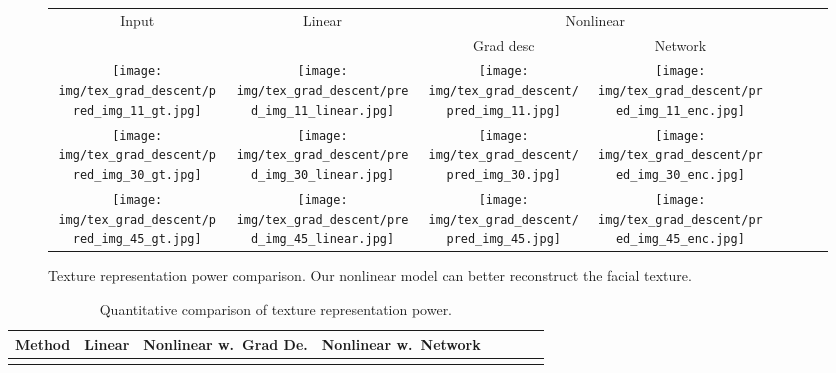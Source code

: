 \begin{figure}[t!]
\begin{center}
\small
\setlength{\tabcolsep}{3pt}
\begin{tabular}{ @{}c@{}c@{}c@{}c@{}c@{}c@{}c@{\hskip 1.5mm}c@{}}
\multirow{2}{*}{Input} & \multirow{2}{*}{Linear} & \multicolumn{2}{c}{Nonlinear} \\ & & Grad desc & Network \\
\texttt{[image: img/tex\_grad\_descent/pred\_img\_11\_gt.jpg]} &
\texttt{[image: img/tex\_grad\_descent/pred\_img\_11\_linear.jpg]} &
\texttt{[image: img/tex\_grad\_descent/pred\_img\_11.jpg]} &
\texttt{[image: img/tex\_grad\_descent/pred\_img\_11\_enc.jpg]} &
\\
\texttt{[image: img/tex\_grad\_descent/pred\_img\_30\_gt.jpg]} &
\texttt{[image: img/tex\_grad\_descent/pred\_img\_30\_linear.jpg]} &
\texttt{[image: img/tex\_grad\_descent/pred\_img\_30.jpg]} &
\texttt{[image: img/tex\_grad\_descent/pred\_img\_30\_enc.jpg]} &
\\
\texttt{[image: img/tex\_grad\_descent/pred\_img\_45\_gt.jpg]} &
\texttt{[image: img/tex\_grad\_descent/pred\_img\_45\_linear.jpg]} &
\texttt{[image: img/tex\_grad\_descent/pred\_img\_45.jpg]} &
\texttt{[image: img/tex\_grad\_descent/pred\_img\_45\_enc.jpg]} &
\\
\end{tabular}
\vspace{-2mm}
\caption{\small Texture representation power comparison. Our nonlinear model can better reconstruct the facial texture.}
\label{fig:tex_representationpower}\figvspace
\end{center}
\end{figure}

\begin{table}[t!]
\footnotesize
\caption{\small{Quantitative comparison of texture representation power.}} 
\label{tab:tex_representation_tab}
\vspace{-6mm}
\begin{center}
\begin{tabular}{ cccccccc}
\toprule 
Method & Linear & Nonlinear w.~Grad De. & Nonlinear w.~Network \\ \midrule
    &  &    &  \\ 
\bottomrule
\end{tabular}
\end{center}
\figvspace\vspace{-2mm}
\end{table}


